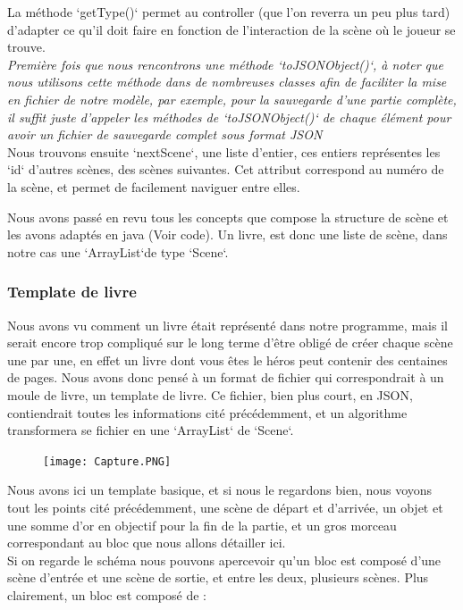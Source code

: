 \documentclass[12pt]{article}
\begin{document}
La méthode `getType()` permet au controller (que l'on reverra un peu plus tard) d'adapter ce qu'il doit faire en fonction de l'interaction de la scène où le joueur se trouve.\\

\textit{Première fois que nous rencontrons une méthode `toJSONObject()`, à noter que nous utilisons cette méthode dans de nombreuses classes afin de faciliter la mise en fichier de notre modèle, par exemple, pour la sauvegarde d'une partie complète, il suffit juste d'appeler les méthodes de `toJSONObject()` de chaque élément pour avoir un fichier de sauvegarde complet sous format JSON}\\

Nous trouvons ensuite `nextScene`, une liste d'entier, ces entiers représentes les `id` d'autres scènes, des scènes suivantes. Cet attribut correspond au numéro de la scène, et permet de facilement naviguer entre elles.

Nous avons passé en revu tous les concepts que compose la structure de scène et les avons adaptés en java (Voir code). Un livre, est donc une liste de scène, dans notre cas une `ArrayList`de type `Scene`.

\subsubsection{Template de livre}
Nous avons vu comment un livre était représenté dans notre programme, mais il serait encore trop compliqué sur le long terme d'être obligé de créer chaque scène une par une, en effet un livre dont vous êtes le héros peut contenir des centaines de pages. 
Nous avons donc pensé à un format de fichier qui correspondrait à un moule de livre, un template de livre. Ce fichier, bien plus court, en JSON, contiendrait toutes les informations cité précédemment, et un algorithme transformera se fichier en une `ArrayList` de `Scene`.\\


\begin{figure}[h]
    \centering
    \texttt{[image: Capture.PNG]}
\end{figure}


Nous avons ici un template basique, et si nous le regardons bien, nous voyons tout les points cité précédemment, une scène de départ et d'arrivée, un objet et une somme d'or en objectif pour la fin de la partie, et un gros morceau correspondant au bloc que nous allons détailler ici.\\
Si on regarde le schéma nous pouvons apercevoir qu'un bloc est composé d'une scène d'entrée et une scène de sortie, et entre les deux, plusieurs scènes. Plus clairement, un bloc est composé de :\\
\end{document}
